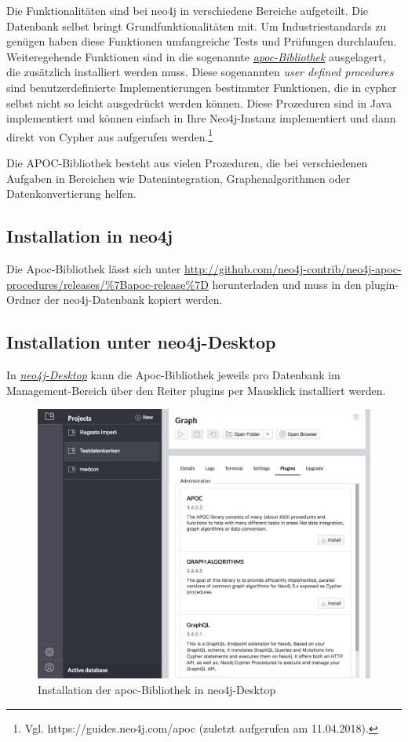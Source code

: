 \documentclass[ngerman,]{scrreprt}
\begin{document}
Die Funktionalitäten sind bei neo4j in verschiedene Bereiche aufgeteilt. Die Datenbank selbst bringt Grundfunktionalitäten mit. Um Industriestandards zu genügen haben diese Funktionen umfangreiche Tests und Prüfungen durchlaufen. Weiteregehende Funktionen sind in die sogenannte \href{https://guides.neo4j.com/apoc}{\emph{apoc-Bibliothek}} ausgelagert, die zusätzlich installiert werden muss. Diese sogenannten \emph{user defined procedures} sind benutzerdefinierte Implementierungen bestimmter Funktionen, die in cypher selbst nicht so leicht ausgedrückt werden können. Diese Prozeduren sind in Java implementiert und können einfach in Ihre Neo4j-Instanz implementiert und dann direkt von Cypher aus aufgerufen werden.\footnote{Vgl. https://guides.neo4j.com/apoc (zuletzt aufgerufen am 11.04.2018).}

Die APOC-Bibliothek besteht aus vielen Prozeduren, die bei verschiedenen Aufgaben in Bereichen wie Datenintegration, Graphenalgorithmen oder Datenkonvertierung helfen.

\subsection{Installation in neo4j}\label{installation-in-neo4j}

Die Apoc-Bibliothek lässt sich unter \url{http://github.com/neo4j-contrib/neo4j-apoc-procedures/releases/\%7Bapoc-release\%7D} herunterladen und muss in den plugin-Ordner der neo4j-Datenbank kopiert werden.

\subsection{Installation unter neo4j-Desktop}\label{installation-unter-neo4j-desktop}

In \href{https://neo4j.com/download/}{\emph{neo4j-Desktop}} kann die Apoc-Bibliothek jeweils pro Datenbank im Management-Bereich über den Reiter plugins per Mausklick installiert werden.

\begin{figure}
\centering
\includegraphics{Bilder/cypherFortgeschrittene/neo4j-Desktop-install-apoc.png}
\caption{Installation der apoc-Bibliothek in neo4j-Desktop}
\end{figure}
\end{document}
